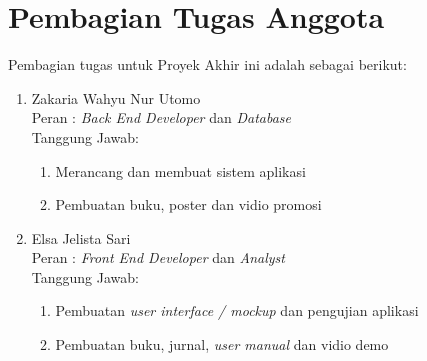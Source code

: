\section{Pembagian Tugas Anggota}
Pembagian tugas untuk Proyek Akhir ini adalah sebagai berikut:

\begin{enumerate}
	
\item	Zakaria Wahyu Nur Utomo \\
Peran	: \textit{Back End Developer} dan \textit{Database} \\
Tanggung Jawab:
\begin{enumerate}
\item	Merancang dan membuat sistem aplikasi
\item	Pembuatan buku, poster dan vidio promosi
\end{enumerate}
\item	Elsa Jelista Sari  \\
Peran	: \textit{Front End Developer} dan \textit{Analyst} \\
Tanggung Jawab: 
\begin{enumerate}
\item	Pembuatan \textit{user interface / mockup} dan pengujian aplikasi
\item	Pembuatan buku, jurnal, \textit{user manual} dan vidio demo
\end{enumerate}

\end{enumerate}
